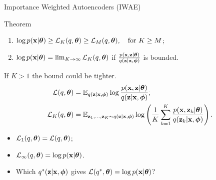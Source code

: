 \begin{frame}{Importance Weighted Autoencoders (IWAE)}
	\begin{block}{Theorem}
		\begin{enumerate}
			\item $\log p(\mathbf{x} | \boldsymbol{\theta}) \geq \mathcal{L}_K (q, \boldsymbol{\theta}) \geq \mathcal{L}_M (q, \boldsymbol{\theta}), \quad \text{for } K \geq M$;
			\item $\log p(\mathbf{x} | \boldsymbol{\theta}) = \lim_{K \rightarrow \infty} \mathcal{L}_K (q, \boldsymbol{\theta})$ if $\frac{p(\mathbf{x}, \mathbf{z} | \boldsymbol{\theta})}{q(\mathbf{z} | \mathbf{x}, \boldsymbol{\phi})}$ is bounded.
		\end{enumerate}
		\vspace{-0.2cm}
	\end{block}
	If $K > 1$ the bound could be tighter.
	\begin{align*}
		\mathcal{L} (q, \boldsymbol{\theta}) &= \mathbb{E}_{q(\mathbf{z} | \mathbf{x}, \boldsymbol{\phi})} \log \frac{p(\mathbf{x}, \mathbf{z} | \boldsymbol{\theta})}{q(\mathbf{z}| \mathbf{x}, \boldsymbol{\phi})}; \\
		\mathcal{L}_K (q, \boldsymbol{\theta}) &= \mathbb{E}_{\mathbf{z}_1, \dots, \mathbf{z}_K \sim q(\mathbf{z} | \mathbf{x}, \boldsymbol{\phi})} \log \left( \frac{1}{K}\sum_{k=1}^K\frac{p(\mathbf{x}, \mathbf{z}_k | \boldsymbol{\theta})}{q(\mathbf{z}_k| \mathbf{x}, \boldsymbol{\phi})} \right).
	\end{align*}
	\vspace{-0.2cm}
	\begin{itemize}
		\item $\mathcal{L}_1(q, \boldsymbol{\theta}) = \mathcal{L}(q, \boldsymbol{\theta})$;
		\item $\mathcal{L}_{\infty}(q, \boldsymbol{\theta}) = \log p(\mathbf{x} | \boldsymbol{\theta})$.
		\item Which $q^*(\mathbf{z} | \mathbf{x}, \boldsymbol{\phi})$ gives $\mathcal{L}(q^*, \boldsymbol{\theta}) = \log p(\mathbf{x} | \boldsymbol{\theta})$? 
	\end{itemize}

\end{frame}

